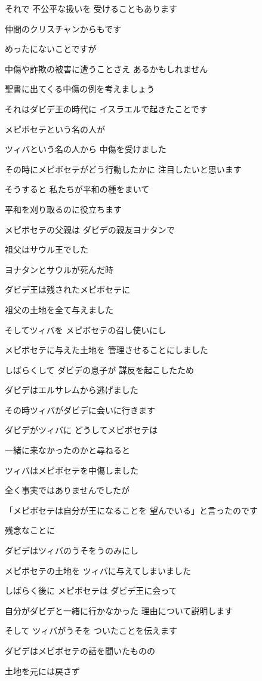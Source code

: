 \documentclass[twocolumn]{jsarticle}
\begin{document}
それで 不公平な扱いを
受けることもあります

仲間のクリスチャンからもです

めったにないことですが

中傷や詐欺の被害に遭うことさえ
あるかもしれません

聖書に出てくる中傷の例を考えましょう

それはダビデ王の時代に
イスラエルで起きたことです

メピボセテという名の人が

ツィバという名の人から
中傷を受けました

その時にメピボセテがどう行動したかに
注目したいと思います

そうすると 私たちが平和の種をまいて

平和を刈り取るのに役立ちます

メピボセテの父親は
ダビデの親友ヨナタンで

祖父はサウル王でした

ヨナタンとサウルが死んだ時

ダビデ王は残されたメピボセテに

祖父の土地を全て与えました

そしてツィバを
メピボセテの召し使いにし

メピボセテに与えた土地を
管理させることにしました

しばらくして ダビデの息子が
謀反を起こしたため

ダビデはエルサレムから逃げました

その時ツィバがダビデに会いに行きます

ダビデがツィバに
どうしてメピボセテは

一緒に来なかったのかと尋ねると

ツィバはメピボセテを中傷しました

全く事実ではありませんでしたが

「メピボセテは自分が王になることを
望んでいる」と言ったのです

残念なことに

ダビデはツィバのうそをうのみにし

メピボセテの土地を
ツィバに与えてしまいました

しばらく後に メピボセテは
ダビデ王に会って

自分がダビデと一緒に行かなかった
理由について説明します

そして ツィバがうそを
ついたことを伝えます

ダビデはメピボセテの話を聞いたものの

土地を元には戻さず
\end{document}
